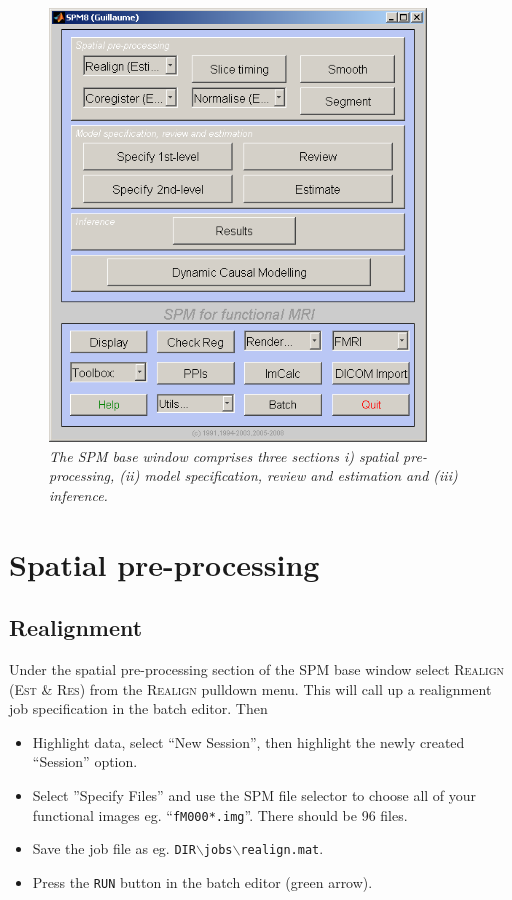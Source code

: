 \begin{figure}
\begin{center}
\includegraphics[width=100mm]{auditory/command}
\caption{\em The SPM base window comprises three sections i) spatial pre-processing, (ii) model specification, review and estimation and (iii) inference. \label{aud_command}}
\end{center}
\end{figure}

\section{Spatial pre-processing}

\subsection{Realignment}

Under the spatial pre-processing section of the SPM base window select \textsc{Realign (Est \& Res)} from the \textsc{Realign} pulldown menu. This will call up a realignment job specification in the batch editor. Then
\begin{itemize}
\item Highlight data, select ``New Session'', then highlight the newly created ``Session'' option.
\item Select ''Specify Files'' and use the SPM file selector to choose all of your functional images eg. ``\texttt{fM000*.img}''. There should be 96 files.
\item Save the job file as eg. \texttt{DIR$\backslash$jobs$\backslash$realign.mat}.
\item Press the \texttt{RUN} button in the batch editor (green arrow).
\end{itemize}

